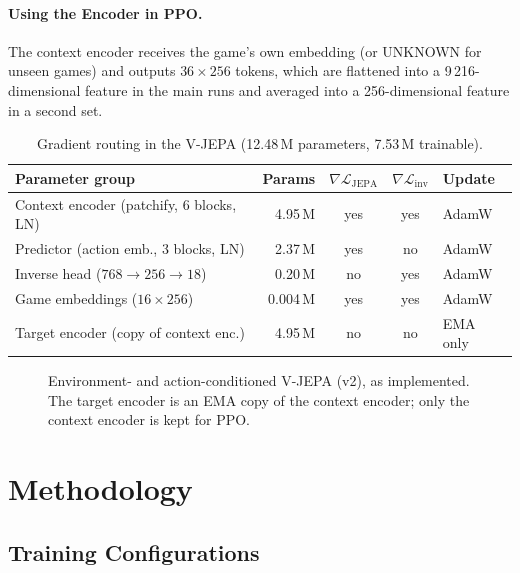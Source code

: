 \documentclass[runningheads]{llncs}
\begin{document}
\paragraph{Using the Encoder in PPO.} The context encoder receives the game's own embedding (or UNKNOWN for
unseen games) and outputs $36\times256$ tokens, which are flattened into a 9\,216-dimensional
feature in the main runs and averaged into a 256-dimensional feature in a second set.

\begin{table}[t]
\centering
\caption{Gradient routing in the V-JEPA (12.48\,M parameters, 7.53\,M trainable).}
\label{tab:grad}
\footnotesize\setlength{\tabcolsep}{4pt}
\begin{tabular}{@{}lrccl@{}}
\toprule
Parameter group & Params & $\nabla\mathcal{L}_{\text{JEPA}}$ & $\nabla\mathcal{L}_{\text{inv}}$ & Update \\
\midrule
Context encoder (patchify, 6 blocks, LN) & 4.95\,M & yes & yes & AdamW \\
Predictor (action emb., 3 blocks, LN) & 2.37\,M & yes & no & AdamW \\
Inverse head ($768\to256\to18$) & 0.20\,M & no & yes & AdamW \\
Game embeddings ($16\times256$) & 0.004\,M & yes & yes & AdamW \\
Target encoder (copy of context enc.) & 4.95\,M & no & no & EMA only \\
\bottomrule
\end{tabular}
\end{table}

\begin{figure}[t]
\centering

\caption{Environment- and action-conditioned V-JEPA (v2), as implemented. The target
encoder is an EMA copy of the context encoder; only the context encoder is kept for PPO.}
\label{fig:jepa}
\end{figure}

\section{Methodology}
\label{sec:method}

\subsection{Training Configurations}
\end{document}
